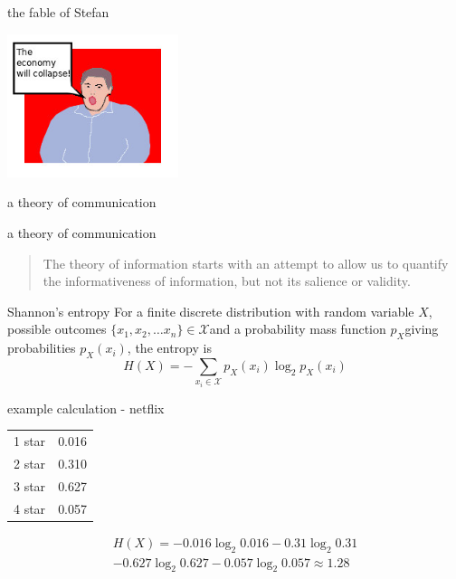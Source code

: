 \documentclass{beamer}
\newcommand{\crish}{\color{reddish}}
\newcommand{\cbla}{\color{black}}
\newcommand{\sm}{\color{reddish}$}
\newcommand{\fm}{$\color{black}}
\begin{document}
\begin{frame}{the fable of Stefan}
  \begin{center}
\includegraphics[width=5cm]{boring_man.jpg}
\end{center}
  \end{frame}


\begin{frame}{a theory of communication}
  \begin{center}
  \end{center}
\end{frame}

\begin{frame}{a theory of communication}
  \begin{quote}
    The theory of information starts with an attempt to allow us to
quantify the informativeness of information, but not its salience or
validity.
  \end{quote}
  \end{frame}

\begin{frame}{Shannon's entropy}
  For a finite discrete distribution with random variable \sm X\fm,
  possible outcomes \sm\{x_1,x_2,\ldots x_n\}\in\mathcal{X}\fm and a
  probability mass function \sm p_X\fm giving probabilities \sm p_X(x_i)\fm, the
  entropy is
\crish
  $$
H(X)=-\sum_{x_i\in \mathcal{X}}{p_X(x_i)\log_2p_X(x_i)}
  $$
\cbla
\end{frame}

\begin{frame}{example calculation - netflix}
  \begin{center}
    \begin{tabular}{l|l}
      \hline
      1 star&0.016\\
      2 star&0.310\\
      3 star&0.627\\
      4 star&0.057\\
      \hline
    \end{tabular}
  \end{center}
  \crish
  \begin{multline*}
    H(X)=-0.016\log_2{0.016}-0.31\log_2{0.31}\\
    -0.627\log_2{0.627}-0.057\log_2{0.057}\approx 1.28
\end{multline*}
\cbla
\end{frame}  
\end{document}
